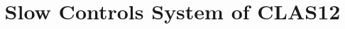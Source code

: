 \title{Slow Controls System of CLAS12}

\author[A]{}

\address[A]{Thomas Jefferson National Accelerator Facility, Newport News, VA, USA}

